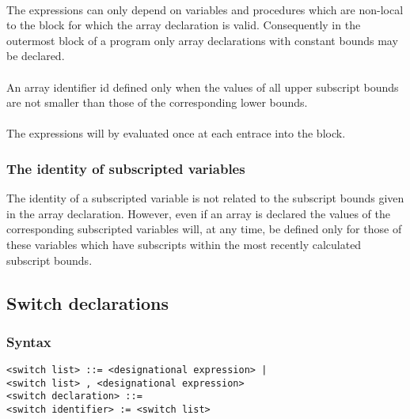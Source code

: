 \documentclass[a4paper,11pt]{article}
\begin{document}
\paragraph{} \label{LblArrayDeclarationsLowerUpperExpressionsP2}
The expressions can only depend on variables and procedures which are
non-local to the block for which the array declaration is valid.
Consequently in the outermost block of a program only array
declarations with constant bounds may be declared.

\paragraph{} \label{LblArrayDeclarationsLowerUpperExpressionsP3}
An array identifier id defined only when the values of all upper
subscript bounds are not smaller than those of the corresponding lower
bounds.

\paragraph{} \label{LblArrayDeclarationsLowerUpperExpressionsP4}
The expressions will by evaluated once at each entrace into the block.

\subsubsection{The identity of subscripted variables}
\label{LblArrayDeclarationsIdentityOfSubscriptedVariables}

The identity of a subscripted variable is not related to the subscript
bounds given in the array declaration.  However, even if an array is
declared  the values of the corresponding subscripted
variables will, at any time, be defined only for those of these
variables which have subscripts within the most recently calculated
subscript bounds.


\subsection{Switch declarations}
\label{LblSwitchDeclarations}


\subsubsection{Syntax}
\label{LblSwitchDeclarationsSyntax}

\begin{flushleft}
\vspace{0.2em}\texttt{<switch list> ::= <designational expression> |\\
  \hspace{1.0cm}<switch list> , <designational expression>}\\

\vspace{0.2em}\texttt{<switch declaration> ::=\\
  \hspace{1.0cm} <switch identifier> := <switch list>}\\
\end{flushleft}
\end{document}

